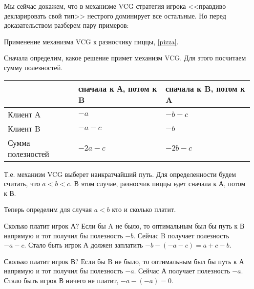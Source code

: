 Мы сейчас докажем, что в механизме VCG стратегия игрока <<правдиво декларировать свой тип>> нестрого доминирует все остальные. Но перед доказательством разберем пару примеров:

\begin{myex}
Применение механизма VCG к разносчику пиццы, \ref{pizza}. 

Сначала определим, какое решение примет механизм VCG. Для этого посчитаем сумму полезностей.

\begin{tabular}{p{3 cm}|p{3 cm}p{3 cm}}
& сначала к А, потом к B & сначала к B, потом к A \\ 
\hline 
Клиент А & $-a$ & $-b-c$ \\ 
Клиент B & $-a-c$ & $-b$ \\ 
Сумма полезностей& $-2a-c$ & $-2b-c$ \\
\end{tabular} 

Т.е. механизм VCG выберет наикратчайший путь. Для определенности будем считать, что $ a<b<c $. В этом случае, разносчик пиццы едет сначала к А, потом к В.

Теперь определим для случая $ a<b $ кто и сколько платит. 

Сколько платит игрок А? Если бы A не было, то оптимальным был бы путь к В напрямую и тот получил бы полезность $ -b $. Сейчас B получает полезность $ -a-c $. Стало быть игрок А должен заплатить $ -b-(-a-c)=a+c-b $. 

Сколько платит игрок В? Если бы B не было, то оптимальным был бы путь к А напрямую и тот получил бы полезность $ -a $. Сейчас А получает полезность $ -a $. Стало быть игрок В ничего не платит, $ -a-(-a)=0 $.
\end{myex}

